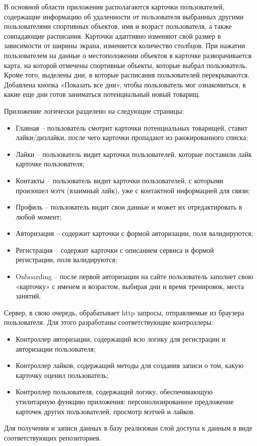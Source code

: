 \documentclass[14pt]{article}
\begin{document}
В основной области приложения располагаются карточки пользователей, содержащие информацию об удаленности
от пользователя выбранных другими пользователями спортивных объектов, имя и возраст пользователя, а также совпадающие расписания.
Карточки адаптивно изменяют свой размер в зависимости от ширины экрана, изменяется количество столбцов. При нажатии пользователем на данные
о местоположении объектов в карточке разворачивается карта, на которой отмечены спортивные объекты, которые выбрал пользователь.
Кроме того, выделены дни, в которые расписания пользователей перекрываются. Добавлена кнопка «Показать все дни», чтобы пользователь мог ознакомиться,
в какие еще дни готов заниматься потенциальный новый товарищ.

Приложение логически разделено на следующие страницы:
\begin{itemize}
	\item Главная – пользователь смотрит карточки потенциальных товарищей, ставит лайки/дизлайки, после чего карточки пропадают из ранжированного списка;
	\item Лайки – пользователь видит карточки пользователей, которые поставили лайк карточке пользователя;
	\item Контакты – пользователь видит карточки пользователей, с которыми произошел мэтч (взаимный лайк), уже с контактной информацией для связи;
	\item Профиль – пользователь видит свои данные и может их отредактировать в любой момент;
	\item Авторизация – содержит карточки с формой авторизации, поля валидируются;
	\item Регистрация – содержит карточки с описанием сервиса и формой регистрации, поля валидируются;
	\item Onboarding – после первой авторизации на сайте пользователь заполнет свою
	      «карточку» с именем и возрастом, выбирая дни и время тренировок, места занятий.
\end{itemize}
Сервер, в свою очередь, обрабатывает http запросы, отправляемые из браузера пользователя. Для этого разработаны соответствующие контроллеры:
\begin{itemize}
	\item Контроллер авторизации, содержащий всю логику для регистрации и авторизации пользователя;
	\item Контроллер лайков, содержащий методы для создания записи о том, какую карточку оценил пользователь;
	\item Контроллер пользователя, содержащий логику, обеспечивающую утилитарную функцию приложения: персонолизированное предложение карточек других пользователей, просмотр мэтчей и лайков.
\end{itemize}
Для получения и записи данных в базу реализован слой доступа к данным в виде соответствующих репозиториев.
\newpage
\end{document}
